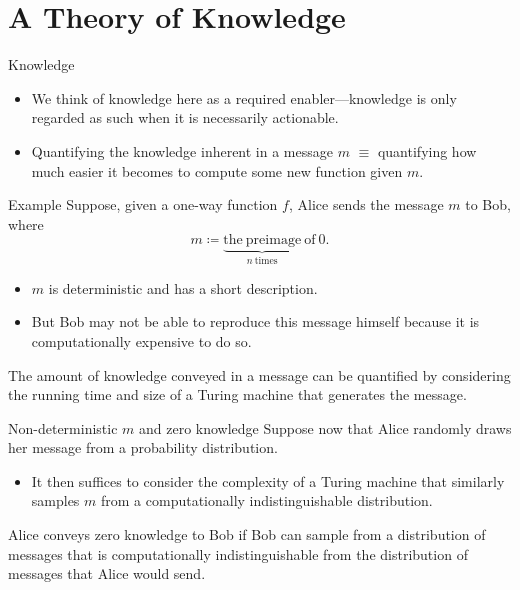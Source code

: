 \section{A Theory of Knowledge}
\begin{frame}{Knowledge}
\begin{itemize}
    \item We think of knowledge here as a required enabler---knowledge is only regarded as such when it is necessarily actionable.
    \item Quantifying the knowledge inherent in a message $m$ $\equiv$ quantifying how much easier it becomes to compute some new function given $m$.
\end{itemize}
\end{frame}

\begin{frame}{Example}
Suppose, given a one-way function $f$, Alice sends the message $m$ to Bob, where
\[m \coloneqq \underbrace{\mathrm{the\ preimage}}_{n\ \text{times}}\ \text{of}\ 0.\]
\begin{itemize}
    \item $m$ is deterministic and has a short description.
    \item But Bob may not be able to reproduce this message himself because it is computationally expensive to do so.
\end{itemize}
\begin{notion}
The amount of knowledge conveyed in a message can be quantified by considering the running time and size of a Turing machine that generates the message.
\end{notion}
\end{frame}

\begin{frame}{Non-deterministic $m$ and zero knowledge}
Suppose now that Alice randomly draws her message from a probability distribution.
\begin{itemize}
    \item It then suffices to consider the complexity of a Turing machine that similarly samples $m$ from a computationally indistinguishable distribution.
\end{itemize}
\begin{notion}
Alice conveys zero knowledge to Bob if Bob can sample from a distribution of messages that is computationally indistinguishable from the distribution of messages that Alice would send.
\end{notion}
\end{frame}

